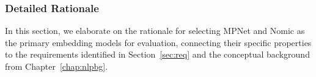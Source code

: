 \documentclass[10pt,oneside]{report}
\begin{document}
%

\subsubsection{Detailed Rationale}\label{sec:rationale_mpnet_nomic} %

In this section, we elaborate on the rationale for selecting MPNet and Nomic as the primary embedding models for evaluation, connecting their specific properties to the requirements identified in Section~\ref{sec:req} and the conceptual background from Chapter~\ref{chap:nlpbg}.
\end{document}
